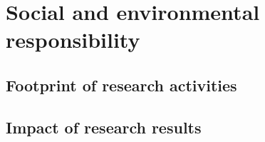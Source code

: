 

\section{Social and environmental responsibility}
\label{DIVERSE:responsabilities}

\subsection{Footprint of research activities}
\label{DIVERSE:footprint}

\subsection{Impact of research results}
\label{DIVERSE:impact}
